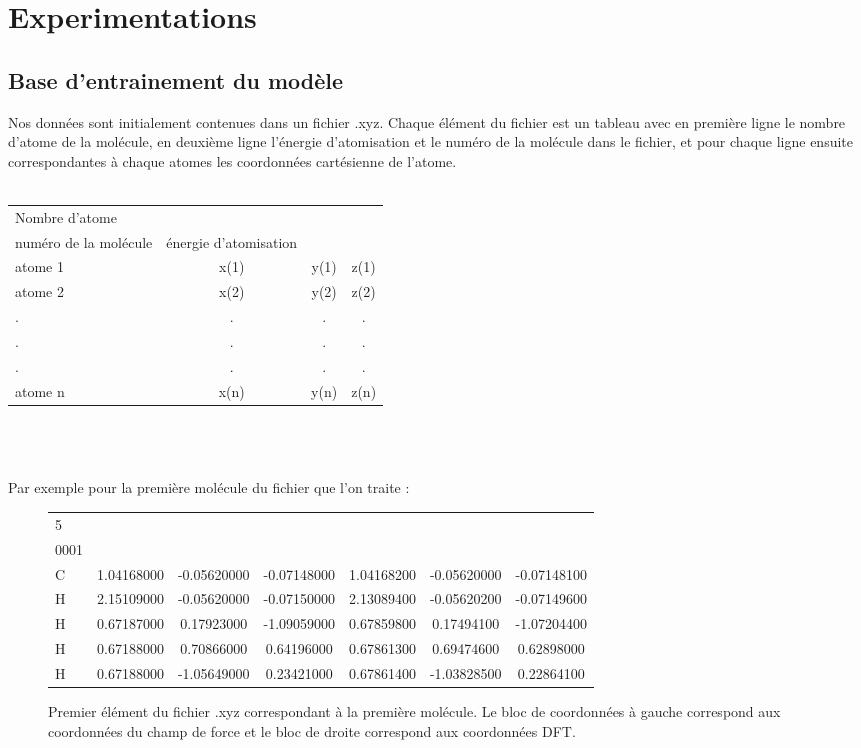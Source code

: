 \documentclass[a4paper,12pt,titlepage]{report}
\begin{document}
\chapter{Experimentations}


\section{Base d'entrainement du modèle}

Nos données sont initialement contenues dans un fichier .xyz.
Chaque élément du fichier est un tableau avec en première ligne le nombre d'atome de la molécule, en deuxième ligne l'énergie d'atomisation et le numéro de la molécule dans le fichier, et pour chaque ligne ensuite correspondantes à chaque atomes les coordonnées cartésienne de l'atome.\\
\\
\begin{tabular}{ l c c c }
   Nombre d'atome &  & & \quad\\
   numéro de la molécule &\quad énergie d'atomisation &\quad &\\
   atome 1 & x(1) & y(1) & \quad z(1) \\
   atome 2 & x(2) & y(2) & \quad z(2) \\
   . & . & . & \quad . \\
   . & . & . & \quad . \\
   . & . & . & \quad . \\
   atome n & x(n) & y(n) &\quad  z(n) \\
 \end{tabular}
 \\
 \\
 \\
 Par exemple pour la première  molécule du fichier que l'on traite :
\begin{figure}[!h]
\begin{tabular}{ l c c c c c c}
   5 &  & & \quad\\
   0001 &\quad -417.031 & & & & & \\
   C & 1.04168000 & -0.05620000 & -0.07148000 & 1.04168200 & -0.05620000 & -0.07148100\\
   H  & 2.15109000 & -0.05620000 & -0.07150000 & 2.13089400 & -0.05620200 & -0.07149600\\
   H  & 0.67187000 & 0.17923000 & -1.09059000  &  0.67859800 &  0.17494100 & -1.07204400\\
   H & 0.67188000 & 0.70866000 & 0.64196000 & 0.67861300 &  0.69474600  & 0.62898000\\
   H & 0.67188000 & -1.05649000 & 0.23421000 & 0.67861400 & -1.03828500  &0.22864100\\
 \end{tabular}
 \caption{Premier élément du fichier .xyz correspondant à la première molécule. Le bloc de coordonnées à gauche correspond aux coordonnées du champ de force et le bloc de droite correspond aux coordonnées DFT.}
 \end{figure}
 
\end{document}
